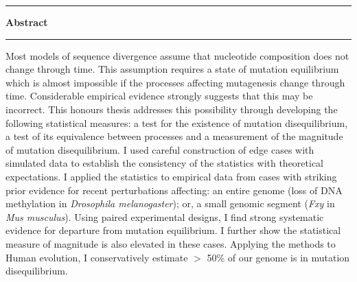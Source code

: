 \thispagestyle{plain}
\begin{center}
    
    \vspace{0.8cm}
    \rule{18cm}{0.5pt}
    \raggedright
    
    \huge

    \textbf{Abstract}\\
    \rule{18cm}{0.5pt}
    
    \vspace{3cm}
    
    \normalsize
    
    Most models of sequence divergence assume that nucleotide composition does not change through time. This assumption requires a state of mutation equilibrium which is almost impossible if the processes affecting mutagenesis change through time. Considerable empirical evidence strongly suggests that this may be incorrect. This honours thesis addresses this possibility through developing the following statistical measures: a test for the existence of mutation disequilibrium, a test of its equivalence between processes and a measurement of the magnitude of mutation disequilibrium. I used careful construction of edge cases with simulated data to establish the consistency of the statistics with theoretical expectations. I applied the statistics to empirical data from cases with striking prior evidence for recent perturbations affecting: an entire genome (loss of DNA methylation in \textit{Drosophila melanogaster}); or, a small genomic segment (\textit{Fxy} in \textit{Mus musculus}). Using paired experimental designs, I find strong systematic evidence for departure from mutation equilibrium. I further show the statistical measure of magnitude is also elevated in these cases. Applying the methods to Human evolution, I conservatively estimate $>$ 50\% of our genome is in mutation disequilibrium. 


\end{center}